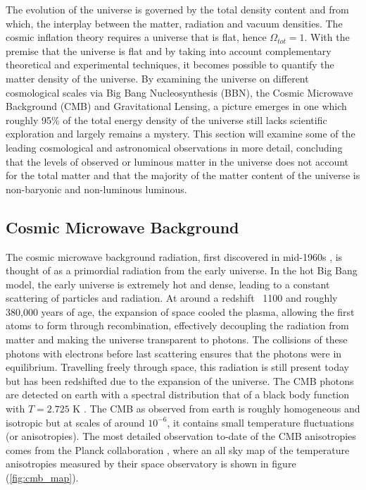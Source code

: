 The evolution of the universe is governed by the total density content and from which, the interplay between the matter, radiation and vacuum densities. The cosmic inflation theory requires a universe that is flat, hence $\Omega_{tot} = 1$. With the premise that the universe is flat and by taking into account complementary theoretical and experimental techniques, it becomes possible to quantify the matter density of the universe. By examining the universe on  different cosmological scales via Big Bang Nucleosynthesis (BBN), the Cosmic Microwave Background (CMB) and Gravitational Lensing, a picture emerges in one which roughly 95\% of the total energy density of the universe still lacks scientific exploration and largely remains a mystery. This section will examine some of the leading cosmological and astronomical observations in more detail, concluding that the levels of observed or luminous matter in the universe does not account for the total matter and that the majority of the matter content of the universe is non-baryonic and non-luminous luminous. 

\subsection{Cosmic Microwave Background}
\label{subsec:CMB}

The cosmic microwave background radiation, first discovered in mid-1960s \cite{CMB_disc}, is thought of as a primordial radiation from the early universe. In the hot Big Bang model, the early universe is extremely hot and dense, leading to a constant scattering of particles and radiation. At around a redshift ~1100 and roughly 380,000 years of age, the expansion of space cooled the plasma, allowing the first atoms to form through recombination, effectively decoupling the radiation from matter and making the universe transparent to photons. The collisions of these photons with electrons before last scattering ensures that the photons were in equilibrium. Travelling freely through space, this radiation is still present today but has been redshifted due to the expansion of the universe. The CMB photons are detected on earth with a spectral distribution that of a black body function with $T = 2.725$ K \cite{cmb_temp}. The CMB as observed from earth is roughly homogeneous and isotropic but at scales of around $10^{-6}$, it contains small temperature fluctuations (or anisotropies). The most detailed observation to-date of the CMB anisotropies comes from the Planck collaboration \cite{plank_cmb_map}, where an all sky map of the temperature anisotropies measured by their space observatory is shown in figure (\ref{fig:cmb_map}).

